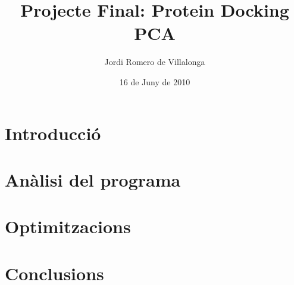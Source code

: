 \documentclass[a4paper]{report}
\author{Jordi Romero de Villalonga}
\title{Projecte Final: Protein Docking \\ PCA}
\date{16 de Juny de 2010}
\begin{document}
\maketitle

\chapter{Introducció}


\chapter{Anàlisi del programa}


\chapter{Optimitzacions}


\chapter{Conclusions}


% 
\end{document}

